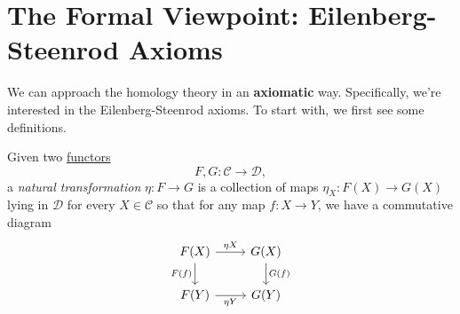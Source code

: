 \section{The Formal Viewpoint: Eilenberg-Steenrod Axioms}
We can approach the homology theory in an \textbf{axiomatic} way. Specifically, we're interested in the Eilenberg-Steenrod axioms.
To start with, we first see some definitions.

\begin{definition}\label{def:natural-transformation}
	Given two \hyperref[def:functor]{functors}
	\[
		F, G \colon \mathscr{C} \to \mathscr{D},
	\]
	a \emph{natural transformation} \(\eta \colon F \to G\) is a collection of maps \(\eta_X \colon F(X) \to G(X)\) lying
	in \(\mathscr{D}\) for every \(X \in \mathscr{C}\) so that for any map \(f \colon X \to Y\), we have a commutative diagram
	\[
		\begin{tikzcd}
			{F(X)} & {G(X)} \\
			{F(Y)} & {G(Y)}
			\arrow["{\eta X}", from=1-1, to=1-2]
			\arrow["{G(f)}", from=1-2, to=2-2]
			\arrow["{\eta Y}"', from=2-1, to=2-2]
			\arrow["{F(f)}"', from=1-1, to=2-1]
		\end{tikzcd}
	\]
\end{definition}

